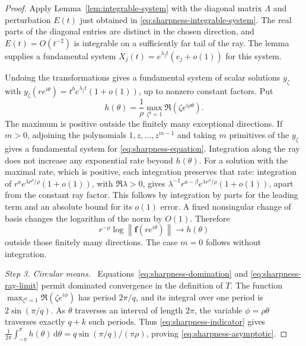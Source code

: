 \documentclass[11pt,letterpaper,reqno]{amsart}
\theoremstyle{remark}
\numberwithin{equation}{section}
\newcommand{\norm}[1]{\left\lVert#1\right\rVert}
\newcommand{\fv}{\bm f}
\newcommand{\step}[1]{\medskip\noindent\emph{#1}\ }
\begin{document}
\begin{proof}
Apply Lemma~\ref{lem:integrable-system} with the diagonal matrix
$\Lambda$ and perturbation $E(t)$ just obtained in
\eqref{eq:sharpness-integrable-system}. The real parts of the diagonal
entries are distinct in the chosen direction, and $E(t)=O(t^{-2})$ is
integrable on a sufficiently far tail of the ray. The lemma supplies a
fundamental system $X_j(t)=e^{\lambda_jt}(e_j+o(1))$ for this system.

Undoing the transformations gives a fundamental system of scalar solutions
$y_\zeta$ with
$y_\zeta(re^{i\theta})=t^b e^{\lambda_\zeta t}(1+o(1))$,
up to nonzero constant factors. Put
\begin{equation}\label{eq:sharpness-indicator}
 h(\theta)=\frac1\rho\max_{\zeta^q=1}\Re(\zeta e^{i\rho\theta}).
\end{equation}
The maximum is positive outside the finitely many exceptional directions.
If $m>0$, adjoining the polynomials $1,z,\ldots,z^{m-1}$ and taking
$m$ primitives of the $y_\zeta$ gives a fundamental system for
\eqref{eq:sharpness-equation}. Integration along the ray does not
increase any exponential rate beyond $h(\theta)$. For a solution with
the maximal rate, which is positive, each integration preserves that
rate: integration of $r^a e^{\lambda r^\rho/\rho}(1+o(1))$, with
$\Re\lambda>0$, gives
$\lambda^{-1}r^{a-\beta}e^{\lambda r^\rho/\rho}(1+o(1))$,
apart from the constant ray factor. This follows by integration by
parts for the leading term and an absolute bound for its $o(1)$ error.
A fixed nonsingular change of basis changes the logarithm of the norm
by $O(1)$. Therefore
\begin{equation}\label{eq:sharpness-ray-limit}
 r^{-\rho}\log\norm{\fv(re^{i\theta})}\longrightarrow h(\theta)
\end{equation}
outside those finitely many directions. The case $m=0$ follows without
integration.

\step{Step 3. Circular means.}
Equations~\eqref{eq:sharpness-domination} and
\eqref{eq:sharpness-ray-limit} permit dominated convergence in the
definition of $T$. The function
$\max_{\zeta^q=1}\Re(\zeta e^{i\phi})$ has period $2\pi/q$, and its
integral over one period is $2\sin(\pi/q)$.
As $\theta$ traverses an interval of length $2\pi$, the variable
$\phi=\rho\theta$ traverses exactly $q+k$ such periods.
Thus \eqref{eq:sharpness-indicator} gives
$\frac1{2\pi}\int_{-\pi}^{\pi}h(\theta)\,\mathrm d\theta
=q\sin(\pi/q)/(\pi\rho)$, proving
\eqref{eq:sharpness-asymptotic}.
\end{proof}
\end{document}
